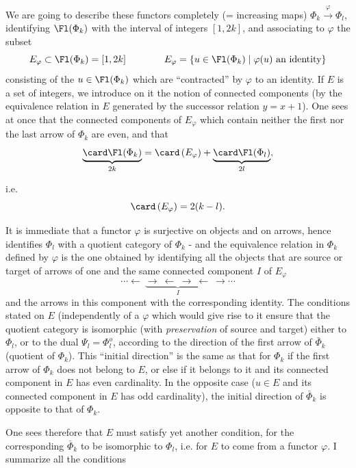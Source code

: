 We are going to describe these functors completely (= increasing maps) $\Phi_k\xrightarrow{\varphi}\Phi_l$, identifying $\Fl(\Phi_k)$ with the interval of integers $[1,2k]$, and associating to $\varphi$ the subset
\[
E_\varphi\subset\Fl(\Phi_k)=[1,2k]\qquad\qquad E_\varphi=\{u\in\Fl(\Phi_k)\mid\varphi(u)\text{ an identity}\}
\]
consisting of the $u\in\Fl(\Phi_k)$ which are ``contracted'' by $\varphi$ to an identity. If $E$ is a set of integers, we introduce on it the notion of connected components (by the equivalence relation in $E$ generated by the successor relation $y=x+1$). One sees at once that the connected components of $E_\varphi$ which contain neither the first nor the last arrow of $\Phi_k$ are even, and that %
\[
\underbrace{\card\Fl(\Phi_k)}_{2k}=\card\,(E_\varphi)+\underbrace{\card\Fl(\Phi_l)}_{2l},
\]

i.e.
\[
\card\,(E_\varphi)=2(k-l).
\]



It is immediate that a functor $\varphi$ is surjective on objects and on arrows, hence identifies $\Phi_l$ with a quotient category of $\Phi_k$ - and the equivalence relation in $\Phi_k$ defined by $\varphi$ is the one obtained by identifying all the objects that are source or target of arrows of one and the same connected component $I$ of $E_\varphi$
\[
\cdots\longleftarrow\ \underbrace{\longrightarrow\ \longleftarrow\ \longrightarrow\ \longleftarrow}_{I}\ \longrightarrow\cdots
\]
and the arrows in this component with the corresponding identity. The conditions stated on $E$ (independently of a $\varphi$ which would give rise to it ensure that the quotient category is isomorphic (with \textit{preservation} of source and target) either to $\Phi_l$, or to the dual $\Psi_l=\Phi_l^o$, according to the direction of the first arrow of $\bar{\Phi}_k$ (quotient of $\Phi_k$). This ``initial direction'' is the same as that for $\Phi_k$ if the first arrow of $\Phi_k$ does not belong to $E$, or else if it belongs to it and its connected component in $E$ has even cardinality. In the opposite case ($u\in E$ and its connected component in $E$ has odd cardinality), the initial direction of $\bar{\Phi}_k$ is opposite to that of $\Phi_k$. %

One sees therefore that $E$ must satisfy yet another condition, for the corresponding $\bar{\Phi}_k$ to be isomorphic to $\Phi_l$, i.e. for $E$ to come from a functor $\varphi$. I summarize all the conditions


